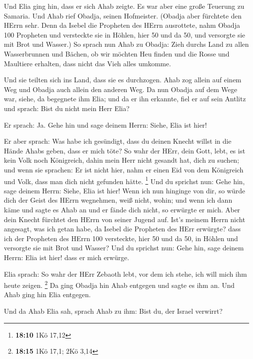  Und Elia ging hin, dass er sich Ahab zeigte. Es war aber
eine große Teuerung zu Samaria.  Und Ahab rief Obadja,
seinen Hofmeister. (Obadja aber fürchtete den HErrn sehr. 
Denn da Isebel die Propheten des HErrn ausrottete, nahm Obadja 100
Propheten und versteckte sie in Höhlen, hier 50 und da 50, und versorgte
sie mit Brot und Wasser.)  So sprach nun Ahab zu Obadja:
Zieh durchs Land zu allen Wasserbrunnen und Bächen, ob wir möchten Heu
finden und die Rosse und Maultiere erhalten, dass nicht das Vieh alles
umkomme.

 Und sie teilten sich ins Land, dass sie es durchzogen. Ahab
zog allein auf einem Weg und Obadja auch allein den anderen Weg.
 Da nun Obadja auf dem Wege war, siehe, da begegnete ihm
Elia; und da er ihn erkannte, fiel er auf sein Antlitz und sprach: Bist
du nicht mein Herr Elia?

 Er sprach: Ja. Gehe hin und sage deinem Herrn: Siehe, Elia
ist hier!

 Er aber sprach: Was habe ich gesündigt, dass du deinen
Knecht willst in die Hände Ahabs geben, dass er mich töte? 
So wahr der HErr, dein Gott, lebt, es ist kein Volk noch Königreich,
dahin mein Herr nicht gesandt hat, dich zu suchen; und wenn sie
sprachen: Er ist nicht hier, nahm er einen Eid von dem Königreich und
Volk, dass man dich nicht gefunden hätte. \footnote{\textbf{18:10} 1Kö
  17,12}  Und du sprichst nun: Gehe hin, sage deinem Herrn:
Siehe, Elia ist hier!  Wenn ich nun hinginge von dir, so
würde dich der Geist des HErrn wegnehmen, weiß nicht, wohin; und wenn
ich dann käme und sagte es Ahab an und er fände dich nicht, so erwürgte
er mich. Aber dein Knecht fürchtet den HErrn von seiner Jugend auf.
 Ist's meinem Herrn nicht angesagt, was ich getan habe, da
Isebel die Propheten des HErr erwürgte? dass ich der Propheten des HErrn
100 versteckte, hier 50 und da 50, in Höhlen und versorgte sie mit Brot
und Wasser?  Und du sprichst nun: Gehe hin, sage deinem
Herrn: Elia ist hier! dass er mich erwürge.

 Elia sprach: So wahr der HErr Zebaoth lebt, vor dem ich
stehe, ich will mich ihm heute zeigen. \footnote{\textbf{18:15} 1Kö
  17,1; 2Kö 3,14}  Da ging Obadja hin Ahab entgegen und
sagte es ihm an. Und Ahab ging hin Elia entgegen.

 Und da Ahab Elia sah, sprach Ahab zu ihm: Bist du, der
Israel verwirrt?

